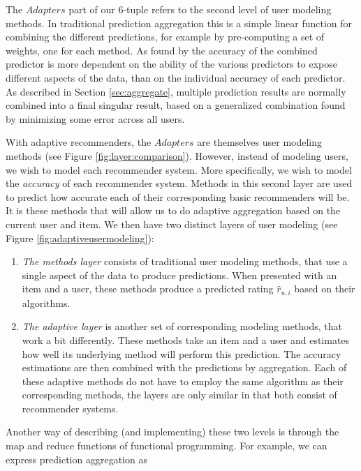 The $Adapters$ part of our 6-tuple refers to the second level of user modeling methods.
In traditional prediction aggregation this is a simple linear function for combining the different predictions,
for example by pre-computing a set of weights, one for each method.
As found by \citet[p6]{Bell2007} the accuracy of the combined predictor is more dependent on the 
ability of the various predictors to expose different aspects of the data, than on 
the individual accuracy of each predictor.
As described in Section \ref{sec:aggregate}, multiple prediction results are normally 
combined into a final singular result,
based on a generalized combination found by minimizing some error across all users.

With adaptive recommenders, the $Adapters$ are themselves user modeling methods 
(see Figure \ref{fig:layer:comparison}).
However, instead of modeling users, we wish to model each recommender system.
More specifically, we wish to model the \emph{accuracy} of each recommender system.
Methods in this second layer are used to predict how accurate each of their corresponding basic recommenders will be.
It is these methods that will allow us to do adaptive aggregation based on the current user and item.
We then have two distinct layers of user modeling 
(see Figure \ref{fig:adaptiveusermodeling}):



\begin{enumerate}
  \item
    \emph{The methods layer} consists of traditional user modeling methods, that use a single aspect of the data to produce predictions.
    When presented with an item and a user, these methods produce a predicted rating $\hat{r}_{u,i}$ based on their algorithms.
  \item
    \emph{The adaptive layer} is another set of corresponding modeling methods, that work a bit differently.
    These methods take an item and a user and estimates how well its underlying method will perform this prediction.
    The accuracy estimations are then combined with the predictions by aggregation.
    Each of these adaptive methods do not have to employ the same algorithm as their corresponding methods,
    the layers are only similar in that both consist of recommender systems.
\end{enumerate}

Another way of describing (and implementing) these two levels is through 
the $\mathrm{map}$ and $\mathrm{reduce}$ functions of functional programming.
For example, we can express prediction aggregation as 

